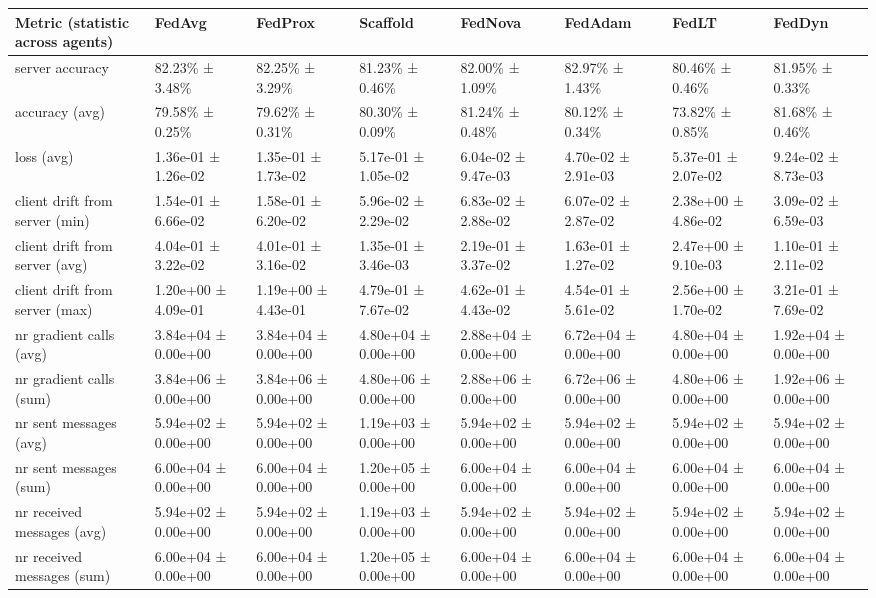 \begin{tabular}{llllllll}
\hline
 Metric (statistic across agents)   & FedAvg              & FedProx             & Scaffold            & FedNova             & FedAdam             & FedLT               & FedDyn              \\
\hline
 server accuracy                    & 82.23\% ± 3.48\%      & 82.25\% ± 3.29\%      & 81.23\% ± 0.46\%      & 82.00\% ± 1.09\%      & 82.97\% ± 1.43\%      & 80.46\% ± 0.46\%      & 81.95\% ± 0.33\%      \\
 accuracy (avg)                     & 79.58\% ± 0.25\%      & 79.62\% ± 0.31\%      & 80.30\% ± 0.09\%      & 81.24\% ± 0.48\%      & 80.12\% ± 0.34\%      & 73.82\% ± 0.85\%      & 81.68\% ± 0.46\%      \\
 loss (avg)                         & 1.36e-01 ± 1.26e-02 & 1.35e-01 ± 1.73e-02 & 5.17e-01 ± 1.05e-02 & 6.04e-02 ± 9.47e-03 & 4.70e-02 ± 2.91e-03 & 5.37e-01 ± 2.07e-02 & 9.24e-02 ± 8.73e-03 \\
 client drift from server (min)     & 1.54e-01 ± 6.66e-02 & 1.58e-01 ± 6.20e-02 & 5.96e-02 ± 2.29e-02 & 6.83e-02 ± 2.88e-02 & 6.07e-02 ± 2.87e-02 & 2.38e+00 ± 4.86e-02 & 3.09e-02 ± 6.59e-03 \\
 client drift from server (avg)     & 4.04e-01 ± 3.22e-02 & 4.01e-01 ± 3.16e-02 & 1.35e-01 ± 3.46e-03 & 2.19e-01 ± 3.37e-02 & 1.63e-01 ± 1.27e-02 & 2.47e+00 ± 9.10e-03 & 1.10e-01 ± 2.11e-02 \\
 client drift from server (max)     & 1.20e+00 ± 4.09e-01 & 1.19e+00 ± 4.43e-01 & 4.79e-01 ± 7.67e-02 & 4.62e-01 ± 4.43e-02 & 4.54e-01 ± 5.61e-02 & 2.56e+00 ± 1.70e-02 & 3.21e-01 ± 7.69e-02 \\
 nr gradient calls (avg)            & 3.84e+04 ± 0.00e+00 & 3.84e+04 ± 0.00e+00 & 4.80e+04 ± 0.00e+00 & 2.88e+04 ± 0.00e+00 & 6.72e+04 ± 0.00e+00 & 4.80e+04 ± 0.00e+00 & 1.92e+04 ± 0.00e+00 \\
 nr gradient calls (sum)            & 3.84e+06 ± 0.00e+00 & 3.84e+06 ± 0.00e+00 & 4.80e+06 ± 0.00e+00 & 2.88e+06 ± 0.00e+00 & 6.72e+06 ± 0.00e+00 & 4.80e+06 ± 0.00e+00 & 1.92e+06 ± 0.00e+00 \\
 nr sent messages (avg)             & 5.94e+02 ± 0.00e+00 & 5.94e+02 ± 0.00e+00 & 1.19e+03 ± 0.00e+00 & 5.94e+02 ± 0.00e+00 & 5.94e+02 ± 0.00e+00 & 5.94e+02 ± 0.00e+00 & 5.94e+02 ± 0.00e+00 \\
 nr sent messages (sum)             & 6.00e+04 ± 0.00e+00 & 6.00e+04 ± 0.00e+00 & 1.20e+05 ± 0.00e+00 & 6.00e+04 ± 0.00e+00 & 6.00e+04 ± 0.00e+00 & 6.00e+04 ± 0.00e+00 & 6.00e+04 ± 0.00e+00 \\
 nr received messages (avg)         & 5.94e+02 ± 0.00e+00 & 5.94e+02 ± 0.00e+00 & 1.19e+03 ± 0.00e+00 & 5.94e+02 ± 0.00e+00 & 5.94e+02 ± 0.00e+00 & 5.94e+02 ± 0.00e+00 & 5.94e+02 ± 0.00e+00 \\
 nr received messages (sum)         & 6.00e+04 ± 0.00e+00 & 6.00e+04 ± 0.00e+00 & 1.20e+05 ± 0.00e+00 & 6.00e+04 ± 0.00e+00 & 6.00e+04 ± 0.00e+00 & 6.00e+04 ± 0.00e+00 & 6.00e+04 ± 0.00e+00 \\
\hline
\end{tabular}